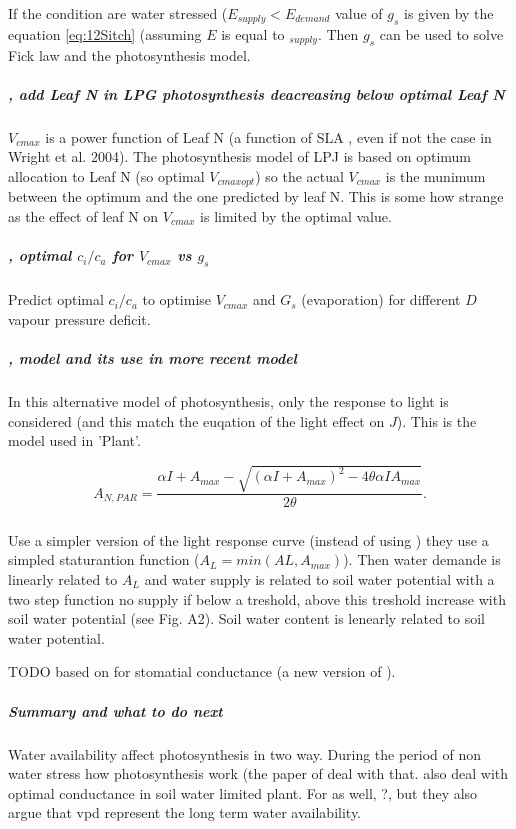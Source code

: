 \documentclass[a4paper,11pt]{article}
\begin{document}
If the condition are water stressed ($E_{supply} < E_{demand}$ value
of $g_s$ is given by the equation \ref{eq:12Sitch} (assuming $E$ is
equal to $_{supply}$. Then $g_s$ can be used to solve Fick law and the
photosynthesis model.

\subparagraph{\citet{Sakschewski-2015}, add Leaf N in LPG photosynthesis deacreasing below optimal Leaf N}

$V_{cmax}$ is a power function of Leaf N (a function of SLA , even if
not the case in Wright et al. 2004). The photosynthesis model of LPJ
is based on optimum allocation to Leaf N (so optimal $V_{cmax opt}$) so
the actual $V_{cmax}$ is the munimum between the optimum and the one
predicted by leaf N. This is some how strange as the effect of leaf N
on $V_{cmax}$ is limited by the optimal value.

\subparagraph{\citet{Prentice-2014}, optimal $c_i/c_a$ for $V_{cmax}$ vs $g_s$}

Predict optimal $c_i/c_a$ to optimise $V_{cmax}$ and $G_s$ (evaporation) for different $D$ vapour pressure deficit.

\subparagraph{\citet{Johnson-1984}, model and its use in more recent model}

In this alternative model of photosynthesis, only the response to
light is considered (and this match the euqation of the light effect
on $J$). This is the model used in 'Plant'.

\begin{equation}
\label{eq:Johnson}
A_{N,PAR} = \frac{ \alpha I + A_{max} - \sqrt{(\alpha I + A_{max})^2 - 4 \theta \alpha I A_{max}}}{2\theta}.
\end{equation}

\subparagraph{\citet{Farrior-2013}}

Use a simpler version of the light response curve (instead of using
\citet{Johnson-1984}) they use a simpled staturantion function
($A_L = min(AL, A_{max})$). Then water demande is linearly related to
$A_L$ and water supply is related to soil water potential with a two
step function no supply if below a treshold, above this treshold
increase with soil water potential (see Fig. A2). Soil water content
is lenearly related to soil water potential.

TODO \citet{Zavala-2005} based on \citet{leuning-1995} for stomatial
conductance (a new version of \citet{Collatz-1991}).

\subparagraph{Summary and what to do next}

Water availability affect photosynthesis in two way. During the period
of non water stress how photosynthesis work (the paper of
\citet{Wright-2003} deal with that. \citet{Medlyn-2011a} also deal
with optimal conductance in soil water limited plant.  For
\citet{Prentice-2014} as well, ?, but they also argue that vpd
represent the long term water availability.
\end{document}
